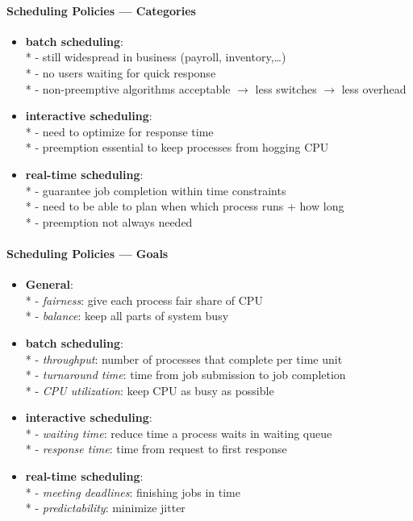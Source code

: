 \paragraph{Scheduling Policies --- Categories}
\begin{itemize}
  \item \textbf{batch scheduling}: \\*
    - still widespread in business (payroll, inventory,\dots) \\*
    - no users waiting for quick response \\*
    - non-preemptive algorithms acceptable \( \to \) less switches \( \to \) less overhead
  \item \textbf{interactive scheduling}: \\*
    - need to optimize for response time \\*
    - preemption essential to keep processes from hogging CPU
  \item \textbf{real-time scheduling}: \\*
    - guarantee job completion within time constraints \\*
    - need to be able to plan when which process runs + how long \\*
    - preemption not always needed
\end{itemize}

\paragraph{Scheduling Policies --- Goals}
\begin{itemize}
  \item \textbf{General}: \\*
    - \emph{fairness}: give each process fair share of CPU \\*
    - \emph{balance}: keep all parts of system busy
  \item \textbf{batch scheduling}: \\*
    - \emph{throughput}: number of processes that complete per time unit \\*
    - \emph{turnaround time}: time from job submission to job completion \\*
    - \emph{CPU utilization}: keep CPU as busy as possible
  \item \textbf{interactive scheduling}: \\*
    - \emph{waiting time}: reduce time a process waits in waiting queue \\*
    - \emph{response time}: time from request to first response
  \item \textbf{real-time scheduling}: \\*
    - \emph{meeting deadlines}: finishing jobs in time \\*
    - \emph{predictability}: minimize jitter
\end{itemize}

